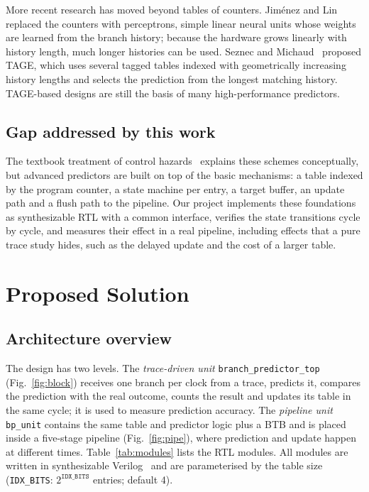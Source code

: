 \documentclass[conference]{IEEEtran}
\begin{document}
More recent research has moved beyond tables of counters. Jim\'enez and Lin~\cite{jimenez2001}
replaced the counters with perceptrons, simple linear neural units whose weights are learned
from the branch history; because the hardware grows linearly with history length, much longer
histories can be used. Seznec and Michaud~\cite{seznec2006} proposed TAGE, which uses several
tagged tables indexed with geometrically increasing history lengths and selects the prediction
from the longest matching history. TAGE-based designs are still the basis of many
high-performance predictors.

\subsection{Gap addressed by this work}
The textbook treatment of control hazards~\cite{hennessy2017,patterson2020} explains these
schemes conceptually, but advanced predictors are built on top of the basic mechanisms: a table
indexed by the program counter, a state machine per entry, a target buffer, an update path and
a flush path to the pipeline. Our project implements these foundations as synthesizable RTL with
a common interface, verifies the state transitions cycle by cycle, and measures their effect in
a real pipeline, including effects that a pure trace study hides, such as the delayed update and
the cost of a larger table.

\section{Proposed Solution}
\subsection{Architecture overview}
The design has two levels. The \emph{trace-driven unit} \texttt{branch\_predictor\_top}
(Fig.~\ref{fig:block}) receives one branch per clock from a trace, predicts it, compares the
prediction with the real outcome, counts the result and updates its table in the same cycle;
it is used to measure prediction accuracy. The \emph{pipeline unit} \texttt{bp\_unit} contains
the same table and predictor logic plus a BTB and is placed inside a five-stage pipeline
(Fig.~\ref{fig:pipe}), where prediction and update happen at different times. Table~\ref{tab:modules}
lists the RTL modules. All modules are written in synthesizable Verilog~\cite{ieee1364} and are
parameterised by the table size (\texttt{IDX\_BITS}: $2^{\texttt{IDX\_BITS}}$ entries; default 4).
\end{document}
